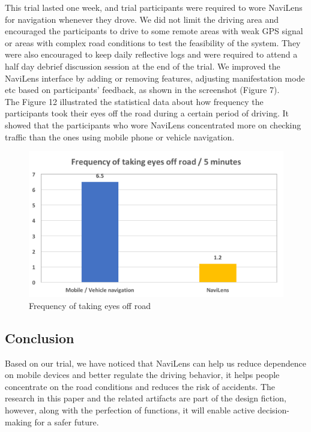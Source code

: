 \documentclass{chi-ext}
\begin{document}
\begin{multicols}{2}
This trial lasted one week, and trial participants were required to wore NaviLens for navigation whenever they drove. We did not limit the driving area and encouraged the participants to drive to some remote areas with weak GPS signal or areas with complex road conditions to test the feasibility of the system. They were also encouraged to keep daily reflective logs and were required to attend a half day debrief discussion session at the end of the trial. We improved the NaviLens interface by adding or removing features, adjusting manifestation mode etc based on participants' feedback, as shown in the screenshot (Figure 7).\\

The Figure 12 illustrated the statistical data about how frequency the participants took their eyes off the road during a certain period of driving. It showed that the participants who wore NaviLens concentrated more on checking traffic than the ones using mobile phone or vehicle navigation.\\

\begin{figure}
 \includegraphics[width=\columnwidth]{eyesOff.png}
 \caption{Frequency of taking eyes off road}
 \label{fig:eyesOff}
\end{figure}

\subsection{Conclusion}
Based on our trial, we have noticed that NaviLens can help us reduce dependence on mobile devices and better regulate the driving behavior, it helps people concentrate on the road conditions and reduces the risk of accidents. The research in this paper and the related artifacts are part of the design fiction, however, along with the perfection of functions, it will enable active decision-making for a safer future.\\

\nocite{ref1}
\nocite{ref2}
\nocite{ref3}
\nocite{ref4}
\nocite{ref5}
\nocite{ref6}




\end{multicols}
\end{document}
